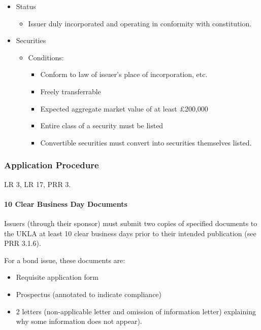 \documentclass[
]{article}
\providecommand{\tightlist}{%
  \setlength{\itemsep}{0pt}\setlength{\parskip}{0pt}}
\begin{document}
\begin{itemize}
\tightlist
\item
  Status

  \begin{itemize}
  \tightlist
  \item
    Issuer duly incorporated and operating in conformity with
    constitution.
  \end{itemize}
\item
  Securities

  \begin{itemize}
  \tightlist
  \item
    Conditions:

    \begin{itemize}
    \tightlist
    \item
      Conform to law of issuer's place of incorporation, etc.
    \item
      Freely transferrable
    \item
      Expected aggregate market value of at least £200,000
    \item
      Entire class of a security must be listed
    \item
      Convertible securities must convert into securities themselves
      listed.
    \end{itemize}
  \end{itemize}
\end{itemize}

\hypertarget{application-procedure}{%
\subsubsection{Application Procedure}\label{application-procedure}}

LR 3, LR 17, PRR 3.

\hypertarget{clear-business-day-documents}{%
\paragraph{10 Clear Business Day
Documents}\label{clear-business-day-documents}}

Issuers (through their sponsor) must submit two copies of specified
documents to the UKLA at least 10 clear business days prior to their
intended publication (see PRR 3.1.6).

For a bond issue, these documents are:

\begin{itemize}
\tightlist
\item
  Requisite application form
\item
  Prospectus (annotated to indicate compliance)
\item
  2 letters (non-applicable letter and omission of information letter)
  explaining why some information does not appear).
\end{itemize}
\end{document}
